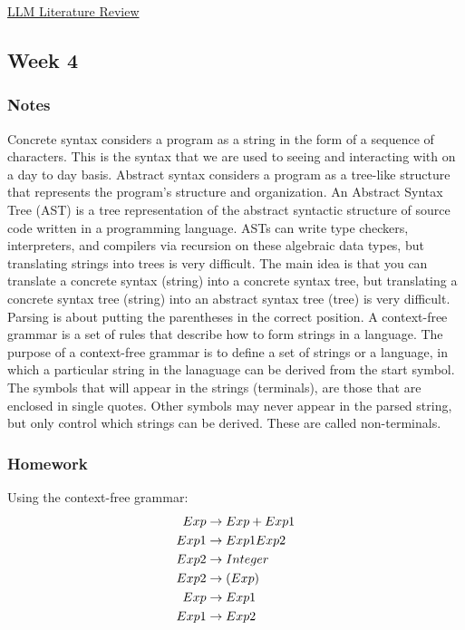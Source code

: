 \documentclass{article}
\theoremstyle{theorem}
\theoremstyle{definition}
\theoremstyle{remark}
\begin{document}
\href{https://github.com/Brandon-Hughes/LLM_Literature_Review}{LLM Literature Review}

\subsection{Week 4}

\subsubsection{Notes}

Concrete syntax considers a program as a string in the form of a sequence of characters. This is the syntax that we are used to seeing and interacting with on a day to day basis. 
Abstract syntax considers a program as a tree-like structure that represents the program's structure and organization. 
An Abstract Syntax Tree (AST) is a tree representation of the abstract syntactic structure of source code written in a programming language. 
ASTs can write type checkers, interpreters, and compilers via recursion on these algebraic data types, but translating strings into trees is very difficult.
The main idea is that you can translate a concrete syntax (string) into a concrete syntax tree, but translating a concrete syntax tree (string) into an abstract syntax tree (tree) is very difficult.
Parsing is about putting the parentheses in the correct position.
A context-free grammar is a set of rules that describe how to form strings in a language.
The purpose of a context-free grammar is to define a set of strings or a language, in which a particular string in the lanaguage can be derived from the start symbol. The symbols that will appear in the strings (terminals), are those that are enclosed in single quotes.
Other symbols may never appear in the parsed string, but only control which strings can be derived. These are called non-terminals.


\subsubsection{Homework}
Using the context-free grammar: 
\begin{align*}
Exp &\rightarrow Exp + Exp1 \\
Exp1 &\rightarrow Exp1 \* Exp2 \\
Exp2 &\rightarrow Integer \\
Exp2 &\rightarrow ( Exp )  \\
Exp &\rightarrow Exp1 \\
Exp1 &\rightarrow Exp2 \\    
\end{align*}
\end{document}
